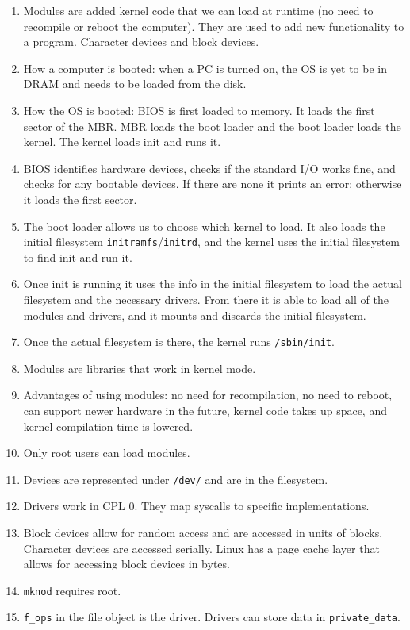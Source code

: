 \documentclass[12pt,a4paper]{article}
\begin{document}
\begin{enumerate}
  \item Modules are added kernel code that we can load at runtime (no need to recompile or reboot the computer). They are used to add new functionality to a program. Character devices and block devices.
  \item How a computer is booted: when a PC is turned on, the OS is yet to be in DRAM and needs to be loaded from the disk.
  \item How the OS is booted: BIOS is first loaded to memory. It loads the first sector of the MBR. MBR loads the boot loader and the boot loader loads the kernel. The kernel loads init and runs it.
  \item BIOS identifies hardware devices, checks if the standard I/O works fine, and checks for any bootable devices. If there are none it prints an error; otherwise it loads the first sector.
  \item The boot loader allows us to choose which kernel to load. It also loads the initial filesystem \texttt{initramfs}/\texttt{initrd}, and the kernel uses the initial filesystem to find init and run it.
  \item Once init is running it uses the info in the initial filesystem to load the actual filesystem and the necessary drivers. From there it is able to load all of the modules and drivers, and it mounts and discards the initial filesystem.
  \item Once the actual filesystem is there, the kernel runs \texttt{/sbin/init}.
  \item Modules are libraries that work in kernel mode.
  \item Advantages of using modules: no need for recompilation, no need to reboot, can support newer hardware in the future, kernel code takes up space, and kernel compilation time is lowered.
  \item Only root users can load modules.
  \item Devices are represented under \texttt{/dev/} and are in the filesystem.
  \item Drivers work in CPL 0. They map syscalls to specific implementations.
  \item Block devices allow for random access and are accessed in units of blocks. Character devices are accessed serially. Linux has a page cache layer that allows for accessing block devices in bytes.
  \item \texttt{mknod} requires root.
  \item \texttt{f\_ops} in the file object is the driver. Drivers can store data in \texttt{private\_data}.
\end{enumerate}
\end{document}
